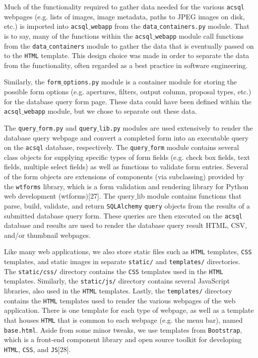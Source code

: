 \documentclass[10pt,journal,compsoc]{IEEEtran}
\begin{document}
Much of the functionality required to gather data needed for the various \texttt{acsql} webpages (e.g. lists of images, image metadata, paths to JPEG images on disk, etc.) is imported
into \texttt{acsql$\_$webapp} from the \texttt{data$\_$containers.py} module.  That is to say, many of the functions within the \texttt{acsql$\_$webapp} module call functions from
the \texttt{data$\_$containers} module to gather the data that is eventually passed on to the \texttt{HTML} template.  This design choice was made in order to separate the data from the
functionality, often regarded as a best practice in software engineering.

Similarly, the \texttt{form$\_$options.py} module is a container module for storing the possible form options (e.g. apertures, filters, output column, proposal types,
etc.) for the database query form page.  These data could have been defined within the \texttt{acsql$\_$webapp} module, but we chose to separate out these data.

The \texttt{query$\_$form.py} and \texttt{query$\_$lib.py} modules are used extensively to render the database query webpage and convert a completed form into an executable query on
the \texttt{acsql} database, respectively.  The \texttt{query$\_$form} module contains several class objects for supplying specific types of form fields (e.g. check box fields, text fields,
multiple select fields) as well as functions to validate form entries.  Several of the form objects are extensions of components (via subclassing) provided by the \texttt{wtforms} library,
which is a form validation and rendering library for Python web development (wtforms)[27].  The {query$\_$lib} module contains functions that parse, build, validate, and return \texttt{SQLAlchemy}
\texttt{query} objects from the results of a submitted database query form.  These queries are then executed on the \texttt{acsql} database and results are used to render the database query
result HTML, CSV, and/or thumbnail webpages.

Like many web applications, we also store static files such as \texttt{HTML} templates, \texttt{CSS} templates, and static images in separate \texttt{static/} and \texttt{templates/} directories.
The \texttt{static/css/} directory contains the \texttt{CSS} templates used in the \texttt{HTML} templates.  Similarly, the \texttt{static/js/} directory contains several JavaScript libraries,
also used in the \texttt{HTML} templates. Lastly, the \texttt{templates/} directory contains the \texttt{HTML} templates used to render the various webpages of the web application.  There is one
template for each type of webpage, as well as a template that houses \texttt{HTML} that is common to each webpage (e.g. the menu bar), named \texttt{base.html}. Aside from some minor tweaks, we use
templates from \texttt{Bootstrap}, which is a front-end component library and open source toolkit for developing \texttt{HTML}, \texttt{CSS}, and \texttt{JS}[28].
\end{document}
